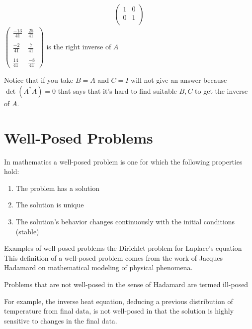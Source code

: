 \begin{example}
\begin{align*}
\begin{pmatrix}
                                                     1 & 0 \\
                                                     0 & 1 \\
                                                 \end{pmatrix}
    \end{align*}
    $
        \begin{pmatrix}
            \displaystyle \frac{-13}{41} & \displaystyle \frac{25}{41} \\\\
            \displaystyle \frac{-2}{41}  & \displaystyle \frac{7}{41}  \\\\
            \displaystyle \frac{14}{41}  & \displaystyle \frac{-8}{41}
        \end{pmatrix}
    $ is the right inverse of $A$


    Notice that if you take $B = A$ and $C = I$ will not give an answer because $\det(A^{*}A) = 0$
    that says that it's hard to find suitable $B,C$ to get the inverse of $A$.
\end{example}


\newpage

\section{Well-Posed Problems}
In mathematics a well-posed problem is one for
which the following properties hold:

\begin{enumerate}
    \item The problem has a solution
    \item The solution is unique
    \item The solution's behavior changes continuously with the initial conditions (stable)
\end{enumerate}
Examples of well-posed problems the Dirichlet problem for Laplace's equation
\\
This definition of a well-posed problem comes from the work of Jacques Hadamard on mathematical modeling of physical phenomena.

Problems that are not well-posed in the sense of Hadamard are termed ill-posed

For example, the inverse heat equation, deducing a previous distribution of temperature from final data, is not well-posed in that the solution is highly sensitive to changes in the final data.

